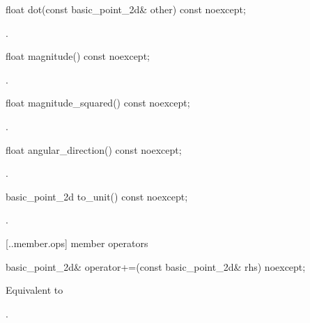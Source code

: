 %
\begin{itemdecl}
float dot(const basic_point_2d& other) const noexcept;
\end{itemdecl}
\begin{itemdescr}
\pnum
\returns
{}.
\end{itemdescr}

%
\begin{itemdecl}
float magnitude() const noexcept;
\end{itemdecl}
\begin{itemdescr}
\pnum
\returns
{}.
\end{itemdescr}

%
\begin{itemdecl}
float magnitude_squared() const noexcept;
\end{itemdecl}
\begin{itemdescr}
\pnum
\returns
{}.
\end{itemdescr}

%
\begin{itemdecl}
float angular_direction() const noexcept;
\end{itemdecl}
\begin{itemdescr}
\pnum
\returns
{}.
\end{itemdescr}

%
\begin{itemdecl}
basic_point_2d to_unit() const noexcept;
\end{itemdecl}
\begin{itemdescr}
\pnum
\returns
{}.
\end{itemdescr}

 [\iotwod.\pointtwod.member.ops] { member operators}

%
\begin{itemdecl}
basic_point_2d& operator+=(const basic_point_2d& rhs) noexcept;
\end{itemdecl}
\begin{itemdescr}
\pnum
\effects
Equivalent to 
	
\pnum
\returns
{}.
\end{itemdescr}

